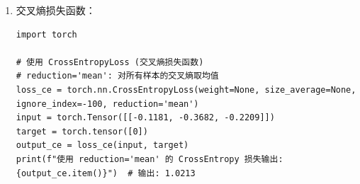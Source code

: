 \begin{enumerate}[label=\arabic*)]
\begin{lstlisting}[style=pythonstyle]
# 使用 MSELoss, reduction='sum'：对所有样本的平方误差取和
loss_mse_sum = torch.nn.MSELoss(reduction='sum')
output_mse_sum = loss_mse_sum(input, target)
print(f"使用 reduction='sum' 的 MSE 损失输出: {output_mse_sum.item()}")  # 输出: 17.0

# 使用 MSELoss, reduction='none'：不对损失进行任何聚合
loss_mse_none = torch.nn.MSELoss(reduction='none')
output_mse_none = loss_mse_none(input, target)
print(f"使用 reduction='none' 的 MSE 损失输出: {output_mse_none}")  # 输出: tensor([6.25, 1.00, 1.00, 8.75])
\end{lstlisting}
\begin{lstlisting}[style=demostyle,numbers=none]
使用 reduction='mean' 的 MSE 损失输出: 4.3125
使用 reduction='sum' 的 MSE 损失输出: 17.25
使用 reduction='none' 的 MSE 损失输出: tensor([6.2500, 1.0000, 1.0000, 9.0000])
\end{lstlisting}
\begin{example}
    \exProblem
    给定输入$input = [1.5, 3.0, 5.0, 4.0]$, 目标$target = [4.0, 2.0, 6.0, 7.0]$，计算均方误差损失函数。
    \exSolution
    MSE损失函数(均方误差)的定义为：
    $$\mathrm{MSE}=\frac1N\sum_{i=1}^N(y_i-\hat{y}_i)^2$$
    其中： $y_i$是目标值。 $\hat{y}_i$是预测值。$N$是样本的数量。

    $(1.5-4.0)^2=6.25, (3.0-2.0)^2=1.0, (5.0-6.0)^2=1.0, (4.0-7.0)^2=9.0$，所以损失值为$[6.25, 1.0, 1.0, 9.0]$。

    \begin{enumerate}[label=\arabic*)]
        \item 当  时：
        对损失进行平均，输出值为$output=\frac{6.25+1.0+1.0+9.0}{4}=4.3125$。
        \item 当  时：
        对损失进行求和，输出值为$output=6.25+1.0+1.0+9.0=17.25$。
        \item 当  时：
        不进行任何聚合操作，输出值为$output=[6.25, 1.0, 1.0, 9.0]$。
        不进行任何聚合操作，输出的张量为每个样本的平方误差：。
    \end{enumerate}
\end{example}
    
    \item 交叉熵损失函数：
\begin{lstlisting}[style=demostyle,numbers=none]
import torch

# 使用 CrossEntropyLoss (交叉熵损失函数)
# reduction='mean': 对所有样本的交叉熵取均值
loss_ce = torch.nn.CrossEntropyLoss(weight=None, size_average=None, ignore_index=-100, reduction='mean')
input = torch.Tensor([[-0.1181, -0.3682, -0.2209]])
target = torch.tensor([0])
output_ce = loss_ce(input, target)
print(f"使用 reduction='mean' 的 CrossEntropy 损失输出: {output_ce.item()}")  # 输出: 1.0213


\end{lstlisting}
\end{enumerate}
